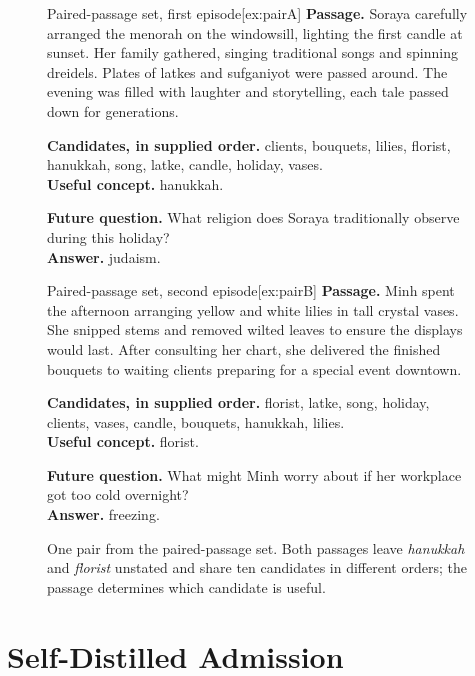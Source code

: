 \begin{figure}[t]
\centering
\begin{minipage}[t]{0.485\textwidth}
\begin{sdabox}[example]{Paired-passage set, first episode}[ex:pairA]
\textbf{Passage.} Soraya carefully arranged the menorah on the windowsill, lighting the first candle at sunset. Her family gathered, singing traditional songs and spinning dreidels. Plates of latkes and sufganiyot were passed around. The evening was filled with laughter and storytelling, each tale passed down for generations.

\medskip
\textbf{Candidates, in supplied order.} clients, bouquets, lilies, florist, hanukkah, song, latke, candle, holiday, vases.\\
\textbf{Useful concept.} hanukkah.

\medskip
\textbf{Future question.} What religion does Soraya traditionally observe during this holiday?\\
\textbf{Answer.} judaism.
\end{sdabox}
\end{minipage}\hfill
\begin{minipage}[t]{0.485\textwidth}
\begin{sdabox}[example]{Paired-passage set, second episode}[ex:pairB]
\textbf{Passage.} Minh spent the afternoon arranging yellow and white lilies in tall crystal vases. She snipped stems and removed wilted leaves to ensure the displays would last. After consulting her chart, she delivered the finished bouquets to waiting clients preparing for a special event downtown.

\medskip
\textbf{Candidates, in supplied order.} florist, latke, song, holiday, clients, vases, candle, bouquets, hanukkah, lilies.\\
\textbf{Useful concept.} florist.

\medskip
\textbf{Future question.} What might Minh worry about if her workplace got too cold overnight?\\
\textbf{Answer.} freezing.
\end{sdabox}
\end{minipage}
\caption{One pair from the paired-passage set. Both passages leave
\emph{hanukkah} and \emph{florist} unstated and share ten candidates in
different orders; the passage determines which candidate is useful.}
\label{fig:pairexample}
\end{figure}



\section{Self-Distilled Admission}
\label{app:training}


